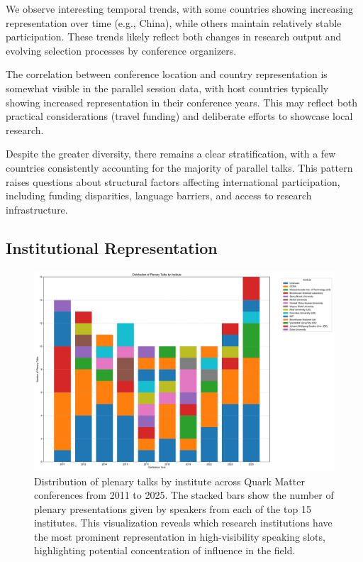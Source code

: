 \documentclass[a4paper,11pt]{article}
\begin{document}
We observe interesting temporal trends, with some countries showing increasing representation over time (e.g., China), while others maintain relatively stable participation. These trends likely reflect both changes in research output and evolving selection processes by conference organizers.

The correlation between conference location and country representation is somewhat visible in the parallel session data, with host countries typically showing increased representation in their conference years. This may reflect both practical considerations (travel funding) and deliberate efforts to showcase local research.

Despite the greater diversity, there remains a clear stratification, with a few countries consistently accounting for the majority of parallel talks. This pattern raises questions about structural factors affecting international participation, including funding disparities, language barriers, and access to research infrastructure.

\subsection{Institutional Representation}

\begin{figure}[H]
\centering
\includegraphics[width=\textwidth]{figures/plenary_talks_by_institute.pdf}
\caption{Distribution of plenary talks by institute across Quark Matter conferences from 2011 to 2025. The stacked bars show the number of plenary presentations given by speakers from each of the top 15 institutes. This visualization reveals which research institutions have the most prominent representation in high-visibility speaking slots, highlighting potential concentration of influence in the field.}
\label{fig:institute_plenary}
\end{figure}
\end{document}
